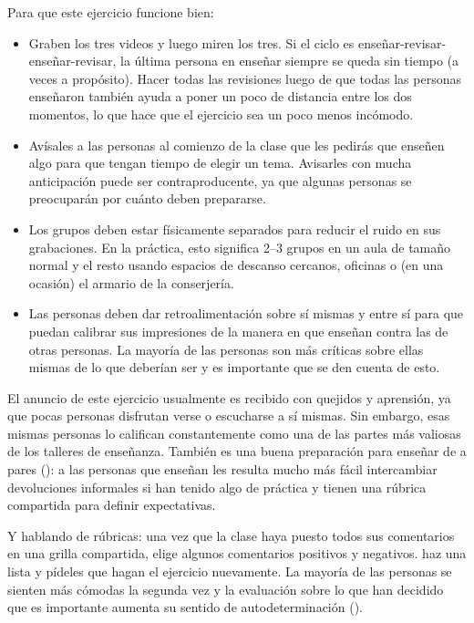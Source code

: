 Para que este ejercicio funcione bien:

\begin{itemize}

\item
  Graben los tres videos y luego miren los tres.
  Si el ciclo es enseñar-revisar-enseñar-revisar,
  la última persona en enseñar siempre se queda sin tiempo
  (a veces a propósito).
  Hacer todas las revisiones luego de que todas las personas enseñaron
  también ayuda a poner un poco de distancia entre los dos momentos,
  lo que hace que el ejercicio sea un poco menos incómodo.

\item
  Avísales a las personas al comienzo de la clase que les pedirás que enseñen algo
  para que tengan tiempo de elegir un tema.
  Avisarles con mucha anticipación puede ser contraproducente,
  ya que algunas personas se preocuparán por cuánto deben prepararse.

\item
  Los grupos deben estar físicamente separados para reducir el ruido en sus grabaciones.
  En la práctica,
  esto significa 2--3 grupos en un aula de tamaño normal
  y el resto usando espacios de descanso cercanos, oficinas
  o (en una ocasión) el armario de la conserjería.

\item
  Las personas deben dar retroalimentación sobre sí mismas y entre sí
  para que puedan calibrar sus impresiones de la manera en que enseñan
  contra las de otras personas.
  La mayoría de las personas son más críticas sobre ellas mismas de lo que deberían ser
  y es importante que se den cuenta de esto.

\end{itemize}

El anuncio de este ejercicio usualmente es recibido con quejidos y aprensión,
ya que pocas personas disfrutan verse o escucharse a sí mismas.
Sin embargo,
esas mismas personas lo califican constantemente como una de las partes más valiosas de los talleres de enseñanza.
También es una buena preparación para enseñar de a pares (): 
a las personas que enseñan les resulta mucho más fácil intercambiar devoluciones informales
si han tenido algo de práctica
y tienen una rúbrica compartida para definir expectativas.

Y hablando de rúbricas:
una vez que la clase haya puesto todos sus comentarios en una grilla compartida,
elige algunos comentarios positivos y negativos.
haz una lista
y pídeles que hagan el ejercicio nuevamente.
La mayoría de las personas se sienten más cómodas la segunda vez
y la evaluación sobre lo que han decidido que es importante aumenta su sentido de autodeterminación ().

